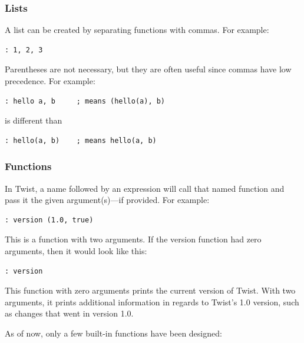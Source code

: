 \subsubsection{Lists}
\label{sec:lists}

A list can be created by separating functions with commas. For example:

\begin{verbatim}
: 1, 2, 3
\end{verbatim}

Parentheses are not necessary, but they are often useful since commas have low precedence. For example:

\begin{verbatim}
: hello a, b     ; means (hello(a), b)
\end{verbatim}

is different than

\begin{verbatim}
: hello(a, b)    ; means hello(a, b)
\end{verbatim}

\subsubsection{Functions}
\label{sec:functions}

In Twist, a name followed by an expression will call that named function and pass it the given argument(s)---if provided. For example:

\begin{verbatim}
: version (1.0, true)
\end{verbatim}

This is a function with two arguments. If the version function had zero arguments, then it would look like this:

\begin{verbatim}
: version
\end{verbatim}

This function with zero arguments prints the current version of Twist. With two arguments, it prints additional information in regards to Twist's 1.0 version, such as changes that went in version 1.0. 

As of now, only a few built-in functions have been designed:


